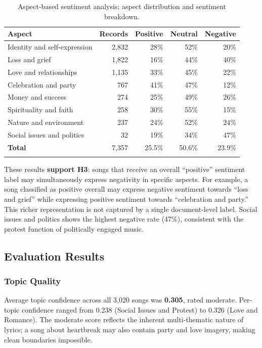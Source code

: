 \documentclass[pdflatex,sn-mathphys-num]{sn-jnl}
\begin{document}
\begin{table}[h]
\caption{Aspect-based sentiment analysis: aspect distribution and sentiment breakdown.}\label{tab:absa}
\begin{tabular}{@{}lrrrr@{}}
\toprule
\textbf{Aspect} & \textbf{Records} & \textbf{Positive} & \textbf{Neutral} & \textbf{Negative} \\
\midrule
Identity and self-expression & 2,832 & 28\% & 52\% & 20\% \\
Loss and grief               & 1,822 & 16\% & 44\% & 40\% \\
Love and relationships       & 1,135 & 33\% & 45\% & 22\% \\
Celebration and party        &   767 & 41\% & 47\% & 12\% \\
Money and success            &   274 & 25\% & 49\% & 26\% \\
Spirituality and faith       &   258 & 30\% & 55\% & 15\% \\
Nature and environment       &   237 & 24\% & 52\% & 24\% \\
Social issues and politics   &    32 & 19\% & 34\% & 47\% \\
\midrule
\textbf{Total}               & 7,357 & 25.5\% & 50.6\% & 23.9\% \\
\botrule
\end{tabular}
\end{table}

These results \textbf{support H3}: songs that receive an overall ``positive'' sentiment label may simultaneously express negativity in specific aspects. For example, a song classified as positive overall may express negative sentiment towards ``loss and grief'' while expressing positive sentiment towards ``celebration and party.'' This richer representation is not captured by a single document-level label. Social issues and politics shows the highest negative rate (47\%), consistent with the protest function of politically engaged music.

\subsection{Evaluation Results}\label{subsec12}

\subsubsection{Topic Quality}\label{subsubsec6}

Average topic confidence across all 3,020 songs was \textbf{0.305}, rated moderate. Per-topic confidence ranged from 0.238 (Social Issues and Protest) to 0.326 (Love and Romance). The moderate score reflects the inherent multi-thematic nature of lyrics; a song about heartbreak may also contain party and love imagery, making clean boundaries impossible.
\end{document}
